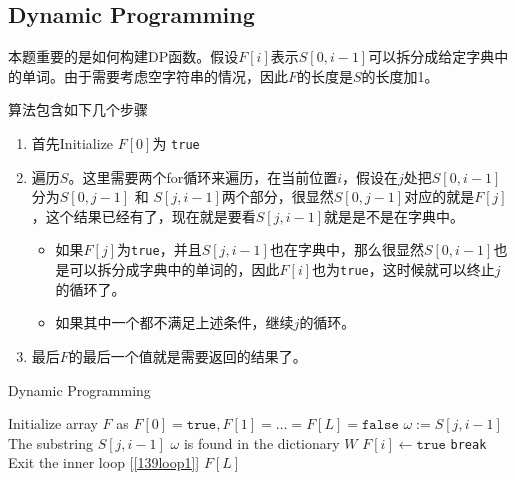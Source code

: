 \subsection{Dynamic Programming}
本题重要的是如何构建DP函数。假设$F[i]$表示$S[0,i-1]$可以拆分成给定字典中的单词。由于需要考虑空字符串的情况，因此$F$的长度是$S$的长度加1。
\par
算法包含如下几个步骤
\begin{enumerate}
    \item 首先Initialize $F[0]$为 \texttt{true}
    \item 遍历$S$。这里需要两个for循环来遍历，在当前位置$i$，假设在$j$处把$S[0,i-1]$分为$S[0, j-1]$ 和 $S[j, i-1]$两个部分，很显然$S[0,j-1]$对应的就是$F[j]$，这个结果已经有了，现在就是要看$S[j,i-1]$就是是不是在字典中。
    \begin{itemize}
        \item 如果$F[j]$为\texttt{true}，并且$S[j,i-1]$也在字典中，那么很显然$S[0,i-1]$也是可以拆分成字典中的单词的，因此$F[i]$也为\texttt{true}，这时候就可以终止$j$的循环了。
        \item 如果其中一个都不满足上述条件，继续$j$的循环。
    \end{itemize}
    \item 最后$F$的最后一个值就是需要返回的结果了。
\end{enumerate}
\setcounter{algorithm}{0}
\begin{algorithm}[H]
\caption{Dynamic Programming}
\begin{algorithmic}[1]
\State Initialize array $F$ as $F[0]=\texttt{true}, F[1]=\ldots=F[L]=\texttt{false}$
 \label{139loop1}
\State $\omega:=S[j, i-1]$ \Comment The substring $S[j,i-1]$
 \Comment $\omega$ is found in the dictionary $W$
\State $F[i]\gets \texttt{true}$
\State \texttt{break} \Comment Exit the inner loop [\ref{139loop1}]
\EndIf
\EndIf
\EndFor
\EndFor
\State \Return $F[L]$
\EndProcedure
\end{algorithmic}
\end{algorithm}
